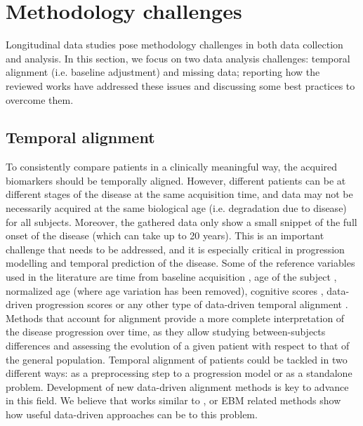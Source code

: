 \section{Methodology challenges}
\label{sec:missing}

Longitudinal data studies pose methodology challenges in both data collection and analysis. In this section, we focus on two data analysis challenges: temporal alignment (i.e. baseline adjustment) and missing data; reporting how the reviewed works have addressed these issues and discussing some best practices to overcome them.

\subsection{Temporal alignment}
\label{subsec:tempalig}

To consistently compare patients in a clinically meaningful way, the acquired biomarkers should be temporally aligned. However, different patients can be at different stages of the disease at the same acquisition time, and data may not be necessarily acquired at the same biological age (i.e. degradation due to disease) for all subjects. Moreover, the gathered data only show a small snippet of the full onset of the disease (which can take up to 20 years). This is an important challenge that needs to be addressed, and it is especially critical in progression modelling and temporal prediction of the disease. Some of the reference variables used in the literature are time from baseline acquisition \cite{Donohue14,Franke2012}, age of the subject \cite{Bateman2012}, normalized age \cite{Lorenzi2014} (where age variation has been removed), cognitive scores \cite{Guerrero2016,Yang2011}, data-driven progression scores \cite{Casanova2018,Clark2012,Davatzikos2009,Jedynak2012,Schmidt-Richberg2015} or any other type of data-driven temporal alignment \cite{Goyal2018}. \\

Methods that account for alignment provide a more complete interpretation of the disease progression over time, as they allow studying between-subjects differences and assessing the evolution of a given patient with respect to that of the general population. Temporal alignment of patients could be tackled in two different ways: as a preprocessing step to a progression model or as a standalone problem. Development of new data-driven alignment methods is key to advance in this field. We believe that works similar to \cite{Bone2018,Goyal2018}, or EBM related methods \cite{Fonteijn2012,Huang2012,Young2014} show how useful data-driven approaches can be to this problem. \\

